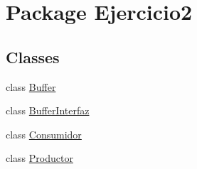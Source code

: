\hypertarget{namespace_ejercicio2}{}\section{Package Ejercicio2}
\label{namespace_ejercicio2}
\subsection*{Classes}
\begin{DoxyCompactItemize}
\item 
class \mbox{\hyperlink{class_ejercicio2_1_1_buffer}{Buffer}}
\item 
class \mbox{\hyperlink{class_ejercicio2_1_1_buffer_interfaz}{Buffer\+Interfaz}}
\item 
class \mbox{\hyperlink{class_ejercicio2_1_1_consumidor}{Consumidor}}
\item 
class \mbox{\hyperlink{class_ejercicio2_1_1_productor}{Productor}}
\end{DoxyCompactItemize}
